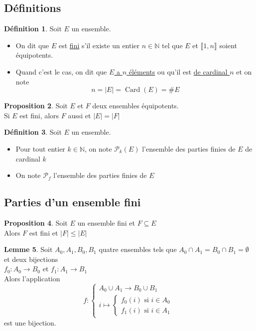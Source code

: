 \documentclass[10pt,a4paper]{article}
\theoremstyle{definition}
\newtheorem{proposition}{Proposition}[section]
\newtheorem{lemme}[proposition]{Lemme}
\newtheorem{definition}[proposition]{Définition}
\DeclareMathOperator{\card}{Card}
\begin{document}
\subsection{Définitions}
\begin{definition}
Soit $E$ un ensemble.
\begin{itemize}
\item On dit que $E$ est \uline{fini} s'il existe un entier $n \in \mathbb{N}$ tel que $E$ et $\llbracket 1, n \rrbracket$ soient équipotents.
\item Quand c'est le cas, on dit que \uline{$E$ a $n$ éléments} ou qu'il est \uline{de cardinal $n$} et on note
\[ n = |E| = \card(E) = \#E \]
\end{itemize}
\end{definition}
\begin{proposition}
Soit $E$ et $F$ deux ensembles équipotents. \\
Si $E$ est fini, alors $F$ aussi et $|E| = |F|$
\end{proposition}
\begin{definition}
Soit $E$ un ensemble.
\begin{itemize}
\item Pour tout entier $k \in \mathbb{N}$, on note $\mathcal{P}_k(E)$ l'ensemble des parties finies de $E$ de cardinal $k$
\item On note $\mathcal{P}_f$ l'ensemble des parties finies de $E$
\end{itemize}
\end{definition}

\subsection{Parties d'un ensemble fini}
\begin{proposition}
Soit $E$ un ensemble fini et $F \subseteq E$ \\
Alors $F$ est fini et $|F| \leq |E|$
\end{proposition}
\begin{lemme}
Soit $A_0, A_1, B_0, B_1$ quatre ensembles tels que $A_0 \cap A_1 = B_0 \cap B_1 = \emptyset$ et deux bijections \\
$f_0: A_0 \to B_0$ et $f_1: A_1 \to B_1$ \\
Alors l'application
\[ f: \begin{cases}
A_0 \cup A_1 \to B_0 \cup B_1 \\
i \mapsto \begin{cases}
f_0(i) \text{ si } i \in A_0 \\
f_1(i) \text{ si } i \in A_1
\end{cases}
\end{cases} \]
est une bijection.
\end{lemme}
\end{document}
